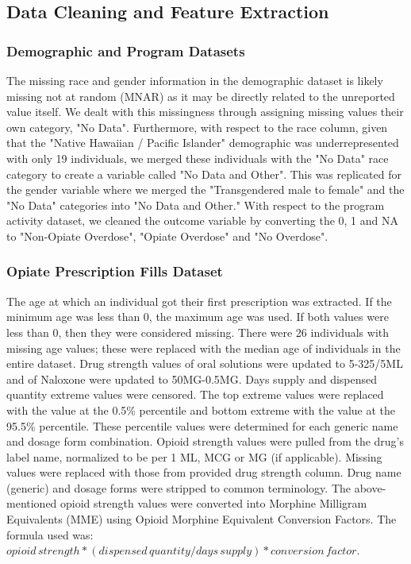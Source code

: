 \documentclass[twoside,10.5pt]{article}
\let\footnote=\endnote
\begin{document}
\subsection{Data Cleaning and Feature Extraction}
\subsubsection{Demographic and Program Datasets}
The missing race and gender information in the demographic dataset is likely missing not at random (MNAR) as it may be directly related to the unreported value itself. We dealt with this missingness through assigning missing values their own category, "No Data". Furthermore, with respect to the race column, given that the "Native Hawaiian / Pacific Islander" demographic was underrepresented with only 19 individuals, we merged these individuals with the "No Data" race category to create a variable called "No Data and Other". This was replicated for the gender variable where we merged the "Transgendered male to female" and the "No Data" categories into "No Data and Other." With respect to the program activity dataset, we cleaned the outcome variable by converting the 0, 1 and NA to "Non-Opiate Overdose", "Opiate Overdose" and "No Overdose". 

\subsubsection{Opiate Prescription Fills Dataset}
The age at which an individual got their first prescription was extracted. If the minimum age was less than 0, the maximum age was used. If both values were less than 0, then they were considered missing. There were 26 individuals with missing age values; these were replaced with the median age of individuals in the entire dataset. Drug strength values of oral solutions were updated to 5-325/5ML and of Naloxone were updated to 50MG-0.5MG. Days supply and dispensed quantity extreme values were censored. The top extreme values were replaced with the value at the 0.5\% percentile and bottom extreme with the value at the 95.5\% percentile. These percentile values were determined for each generic name and dosage form combination. Opioid strength values were pulled from the drug's label name, normalized to be per 1 ML, MCG or MG (if applicable). Missing values were replaced with those from provided drug strength column. Drug name (generic) and dosage forms were stripped to common terminology. The above-mentioned opioid strength values were converted into Morphine Milligram Equivalents (MME) using Opioid Morphine Equivalent Conversion Factors\footnote{\cite{CMS}}. The formula used was: 
$opioid\,strength * (dispensed\,quantity / days\,supply) * conversion\,factor$.
\end{document}
